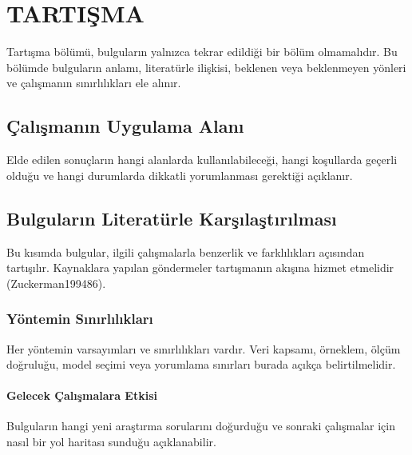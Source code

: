 \documentclass[12pt,a4paper]{report}
\providecommand{\parencite}[1]{(#1)}
\begin{document}
\chapter{TARTI\c{S}MA}\label{ch:ifnecch5}

Tart\i{}\c{s}ma b\"{o}l\"{u}m\"{u}, bulgular\i{}n yaln\i{}zca tekrar edildi\u{g}i bir b\"{o}l\"{u}m olmamal\i{}d\i{}r. Bu b\"{o}l\"{u}mde bulgular\i{}n anlam\i{}, literat\"{u}rle ili\c{s}kisi, beklenen veya beklenmeyen y\"{o}nleri ve \c{c}al\i{}\c{s}man\i{}n s\i{}n\i{}rl\i{}l\i{}klar\i{} ele al\i{}n\i{}r.

\section{\c{C}al\i{}\c{s}man\i{}n Uygulama Alan\i{}}

Elde edilen sonu\c{c}lar\i{}n hangi alanlarda kullan\i{}labilece\u{g}i, hangi ko\c{s}ullarda ge\c{c}erli oldu\u{g}u ve hangi durumlarda dikkatli yorumlanmas\i{} gerekti\u{g}i a\c{c}\i{}klan\i{}r.

\section{Bulgular\i{}n Literat\"{u}rle Kar\c{s}\i{}la\c{s}t\i{}r\i{}lmas\i{}}

Bu k\i{}s\i{}mda bulgular, ilgili \c{c}al\i{}\c{s}malarla benzerlik ve farkl\i{}l\i{}klar\i{} a\c{c}\i{}s\i{}ndan tart\i{}\c{s}\i{}l\i{}r. Kaynaklara yap\i{}lan g\"{o}ndermeler tart\i{}\c{s}man\i{}n ak\i{}\c{s}\i{}na hizmet etmelidir \parencite{Zuckerman199486}.

\subsection{Y\"{o}ntemin S\i{}n\i{}rl\i{}l\i{}klar\i{}}

Her y\"{o}ntemin varsay\i{}mlar\i{} ve s\i{}n\i{}rl\i{}l\i{}klar\i{} vard\i{}r. Veri kapsam\i{}, \"{o}rneklem, \"{o}l\c{c}\"{u}m do\u{g}rulu\u{g}u, model se\c{c}imi veya yorumlama s\i{}n\i{}rlar\i{} burada a\c{c}\i{}k\c{c}a belirtilmelidir.

\subsubsection{Gelecek \c{C}al\i{}\c{s}malara Etkisi}

Bulgular\i{}n hangi yeni ara\c{s}t\i{}rma sorular\i{}n\i{} do\u{g}urdu\u{g}u ve sonraki \c{c}al\i{}\c{s}malar i\c{c}in nas\i{}l bir yol haritas\i{} sundu\u{g}u a\c{c}\i{}klanabilir.
\end{document}
